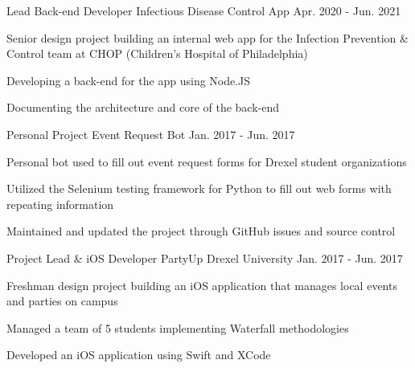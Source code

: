 

\begin{cventries}

  \cventry
    {Lead Back-end Developer} %
    {Infectious Disease Control App} %
    {} %
    {Apr. 2020 - Jun. 2021} %
    {
      \begin{cvitems} %
        \item Senior design project building an internal web app for the Infection Prevention \& Control team at CHOP (Children's Hospital of Philadelphia)
        \item Developing a back-end for the app using Node.JS
        \item Documenting the architecture and core of the back-end
      \end{cvitems}
    }

  \cventry
    {Personal Project} %
    {Event Request Bot} %
    {} %
    {Jan. 2017 - Jun. 2017} %
    {
      \begin{cvitems} %
        \item Personal bot used to fill out event request forms for Drexel student organizations
        \item Utilized the Selenium testing framework for Python to fill out web forms with repeating information
        \item Maintained and updated the project through GitHub issues and source control
      \end{cvitems}
    }

  \cventry
    {Project Lead \& iOS Developer} %
    {PartyUp} %
    {Drexel University} %
    {Jan. 2017 - Jun. 2017} %
    {
      \begin{cvitems} %
        \item Freshman design project building an iOS application that manages local events and parties on campus
        \item Managed a team of 5 students implementing Waterfall methodologies
        \item Developed an iOS application using Swift and XCode
      \end{cvitems}
    }

\end{cventries}